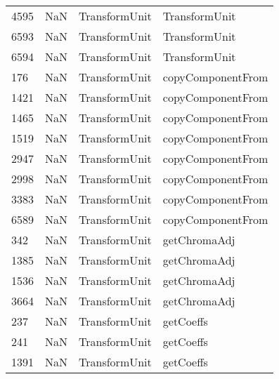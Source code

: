 \begin{tabular}{llll}
4595 &                   NaN &              TransformUnit &                             TransformUnit \\
6593 &                   NaN &              TransformUnit &                             TransformUnit \\
6594 &                   NaN &              TransformUnit &                             TransformUnit \\
176  &                   NaN &              TransformUnit &                         copyComponentFrom \\
1421 &                   NaN &              TransformUnit &                         copyComponentFrom \\
1465 &                   NaN &              TransformUnit &                         copyComponentFrom \\
1519 &                   NaN &              TransformUnit &                         copyComponentFrom \\
2947 &                   NaN &              TransformUnit &                         copyComponentFrom \\
2998 &                   NaN &              TransformUnit &                         copyComponentFrom \\
3383 &                   NaN &              TransformUnit &                         copyComponentFrom \\
6589 &                   NaN &              TransformUnit &                         copyComponentFrom \\
342  &                   NaN &              TransformUnit &                              getChromaAdj \\
1385 &                   NaN &              TransformUnit &                              getChromaAdj \\
1536 &                   NaN &              TransformUnit &                              getChromaAdj \\
3664 &                   NaN &              TransformUnit &                              getChromaAdj \\
237  &                   NaN &              TransformUnit &                                 getCoeffs \\
241  &                   NaN &              TransformUnit &                                 getCoeffs \\
1391 &                   NaN &              TransformUnit &                                 getCoeffs \\

\end{tabular}
